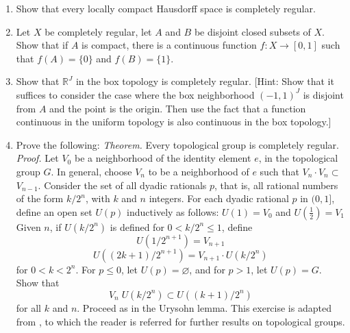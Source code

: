 \begin{enumerate}[itemsep=0.4em, parsep=0pt, topsep=0pt, partopsep=0pt, leftmargin=*, label=\arabic*., ref=\arabic*]
\item Show that every locally compact Hausdorff space is completely regular.
\item Let \(X\) be completely regular, let \(A\) and \(B\) be disjoint closed subsets of \(X\). Show that if \(A\) is compact, there is a continuous function \(f : X \rightarrow [ {0,1}]\) such that \(f( A) = \{ 0\}\) and \(f( B) = \{ 1\}\).
\item Show that \(\mathbb{R}^{J}\) in the box topology is completely regular. [Hint: Show that it suffices to consider the case where the box neighborhood \({( -1,1) }^{J}\) is disjoint from \(A\) and the point is the origin. Then use the fact that a function continuous in the uniform topology is also continuous in the box topology.]

\item[*10.] Prove the following: \textsl{Theorem.} Every topological group is completely regular. \textsl{Proof.} Let \(V_{0}\) be a neighborhood of the identity element \(e\), in the topological group \(G\). In general, choose \(V_{n}\) to be a neighborhood of \(e\) such that \(V_{n} \cdot {V}_{n} \subset\) \(V_{n - 1}\). Consider the set of all dyadic rationals \(p\), that is, all rational numbers of the form \(k/2^{n}\), with \(k\) and \(n\) integers. For each dyadic rational \(p\) in \((0,1\rbrack\), define an open set \(U( p)\) inductively as follows: \(U(1) = V_{0}\) and \(U( \frac{1}{2}) = V_{1}\) Given \(n\), if \(U( {k/2^{n}})\) is defined for \(0 < k/2^{n} \leq 1\), define \[ U( {1/2^{n + 1}}) = V_{n + 1} \] \[ U( {( {{2k} + 1}) /2^{n + 1}}) = V_{n + 1} \cdot U( {k/2^{n}}) \] for \(0 < k < 2^{n}\). For \(p \leq 0\), let \(U( p) = \varnothing\), and for \(p > 1\), let \(U( p) = G\). Show that \[ V_{n}\;U( {k/2^{n}}) \subset U( {( {k + 1}) /2^{n}}) \] for all \(k\) and \(n\). Proceed as in the Urysohn lemma. This exercise is adapted from \cite{MontgomeryZippin1955}, to which the reader is referred for further results on topological groups.


\end{enumerate}
